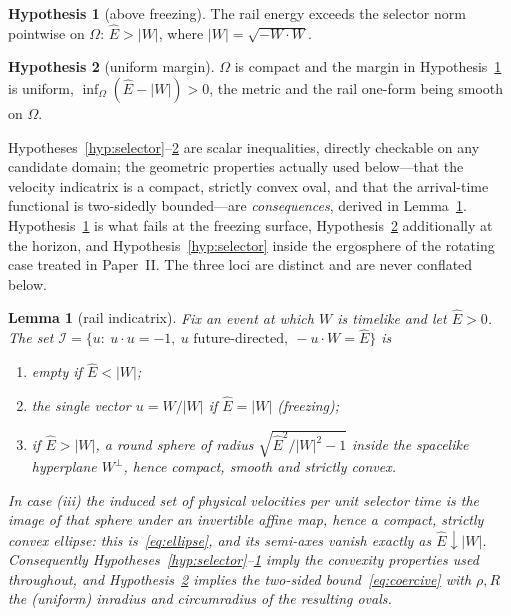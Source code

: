 \documentclass[12pt]{iopart}
\newcommand{\Ehat}{\hat E}
\theoremstyle{plain}
\theoremstyle{definition}
\newtheorem{hypothesis}{Hypothesis}
\theoremstyle{plain}
\newtheorem{auxlemma}{Lemma}
\theoremstyle{remark}
\begin{document}
\begin{hypothesis}[above freezing]\label{hyp:convex}
The rail energy exceeds the selector norm pointwise on $\Omega$:
$\Ehat>|W|$, where $|W|=\sqrt{-W\cdot W}$.
\end{hypothesis}

\begin{hypothesis}[uniform margin]\label{hyp:coercive}
$\Omega$ is compact and the margin in Hypothesis~\ref{hyp:convex} is uniform,
$\inf_\Omega(\Ehat-|W|)>0$, the metric and the rail one-form being smooth on $\Omega$.
\end{hypothesis}

Hypotheses~\ref{hyp:selector}--\ref{hyp:coercive} are scalar inequalities, directly
checkable on any candidate domain; the geometric properties actually used below---that the
velocity indicatrix is a compact, strictly convex oval, and that the arrival-time
functional is two-sidedly bounded---are \emph{consequences}, derived in
Lemma~\ref{lem:indicatrix}. Hypothesis~\ref{hyp:convex} is what fails at the freezing
surface, Hypothesis~\ref{hyp:coercive} additionally at the horizon, and
Hypothesis~\ref{hyp:selector} inside the ergosphere of the rotating case treated in
Paper~II. The three loci are distinct and are never conflated below.

\begin{auxlemma}[rail indicatrix]\label{lem:indicatrix}
Fix an event at which $W$ is timelike and let $\Ehat>0$. The set
$\mathcal I=\{u:\ u\cdot u=-1,\ u \text{ future-directed},\ -u\cdot W=\Ehat\}$ is
\begin{enumerate}
\item[(i)] empty if $\Ehat<|W|$;
\item[(ii)] the single vector $u=W/|W|$ if $\Ehat=|W|$ \emph{(freezing)};
\item[(iii)] if $\Ehat>|W|$, a round sphere of radius $\sqrt{\Ehat^2/|W|^2-1}$ inside the
spacelike hyperplane $W^\perp$, hence compact, smooth and strictly convex.
\end{enumerate}
In case (iii) the induced set of physical velocities per unit selector time is the image of
that sphere under an invertible affine map, hence a compact, strictly convex ellipse: this
is~\eqref{eq:ellipse}, and its semi-axes vanish exactly as $\Ehat\downarrow|W|$.
Consequently Hypotheses~\ref{hyp:selector}--\ref{hyp:convex} imply the convexity properties
used throughout, and Hypothesis~\ref{hyp:coercive} implies the two-sided
bound~\eqref{eq:coercive} with $\rho,R$ the (uniform) inradius and circumradius of the
resulting ovals.
\end{auxlemma}
\end{document}
